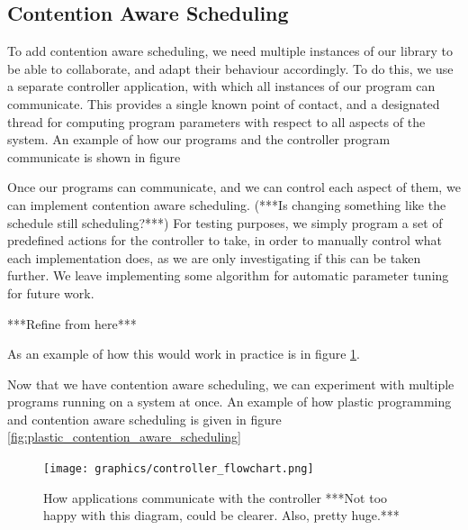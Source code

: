 \subsection{Contention Aware Scheduling}

To add contention aware scheduling, we need multiple instances of our library to be able to collaborate, and adapt their behaviour accordingly. To do this, we use a separate controller application, with which all instances of our program can communicate. This provides a single known point of contact, and a designated thread for computing program parameters with respect to all aspects of the system. An example of how our programs and the controller program communicate is shown in figure 

Once our programs can communicate, and we can control each aspect of them, we can implement contention aware scheduling. (***Is changing something like the schedule still scheduling?***) For testing purposes, we simply program a set of predefined actions for the controller to take, in order to manually control what each implementation does, as we are only investigating if this can be taken further. We leave implementing some algorithm for automatic parameter tuning for future work.

***Refine from here***

As an example of how this would work in practice is in figure \ref{fig:controller_flowchart}.

Now that we have contention aware scheduling, we can experiment with multiple programs running on a system at once. An example of how plastic programming and contention aware scheduling is given in figure \ref{fig:plastic_contention_aware_scheduling}



\begin{figure}
	\texttt{[image: graphics/controller\_flowchart.png]}
	\caption{How applications communicate with the controller ***Not too happy with this diagram, could be clearer. Also, pretty huge.***}
	\label{fig:controller_flowchart}
\end{figure}

